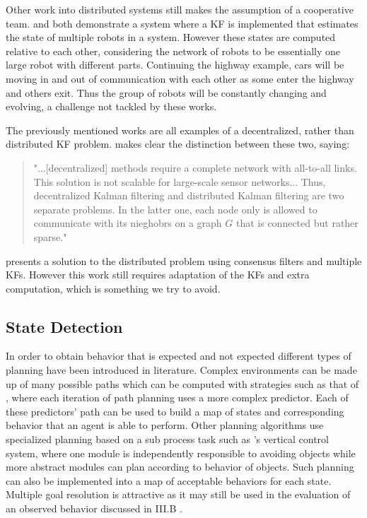 \documentclass[conference]{IEEEtran}
\begin{document}
Other work into distributed systems still makes the assumption of a cooperative team. \cite{Sanderson1997} and \cite{Roumeliotis2002} both demonstrate a system where a KF is implemented that estimates the state of multiple robots in a system. However these states are computed relative to each other, considering the network of robots to be essentially one large robot with different parts. Continuing the highway example, cars will be moving in and out of communication with each other as some enter the highway and others exit. Thus the group of robots will be constantly changing and evolving, a challenge not tackled by these works.

The previously mentioned works are all examples of a decentralized, rather than distributed KF problem. \cite{Olfati-Saber2005} makes clear the distinction between these two, saying:
\begin{quote}"...[decentralized] methods require a complete network with all-to-all links. This solution is not scalable for large-scale sensor networks... Thus, decentralized Kalman filtering and distributed Kalman filtering are two separate problems. In the latter one, each node only is allowed to communicate with its nieghobrs on a graph $G$ that is connected but rather sparse."
\end{quote}
\cite{Olfati-Saber2005} presents a solution to the distributed problem using consensus filters and multiple KFs. However this work still requires adaptation of the KFs and extra computation, which is something we try to avoid.

\subsection{State Detection}

In order to obtain behavior that is expected and not expected different types of planning have been introduced in literature. Complex environments can be made up of many possible paths which can be computed with strategies such as that of \cite{tallavajhula2016list}, where each iteration of path planning uses a more complex predictor. Each of these predictors' path can be used to build a map of states and corresponding behavior that an agent is able to perform. 
Other planning algorithms use specialized planning based on a sub process task such as \cite{ahn2008robust}'s vertical control system, where one module is independently responsible to avoiding objects while more abstract modules can plan according to behavior of objects. Such planning can also be implemented into a map of acceptable behaviors for each state. Multiple goal resolution is attractive as it may still be used in the evaluation of an observed behavior discussed in III.B .
\end{document}
